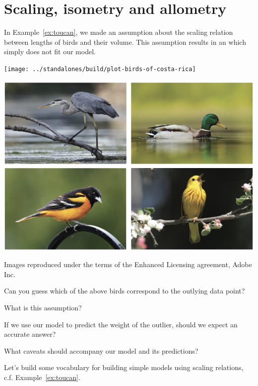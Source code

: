 \documentclass[../main.tex]{subfiles}
\begin{document}
 \section{Scaling, isometry and allometry}
In Example~\ref{ex:toucan}, we made an assumption about the scaling relation between lengths of birds and their volume. This assumption results in an  which simply does not fit our model.

\begin{minipage}{.5\textwidth}
  \texttt{[image: ../standalones/build/plot-birds-of-costa-rica]}
\end{minipage}
\begin{minipage}{.5\textwidth}
  \includegraphics[width=\textwidth]{../standalones/image-birds.png}

  {\footnotesize{} Images reproduced under the terms of the Enhanced Licensing agreement, Adobe Inc.}
\end{minipage}

Can you guess which of the above birds correspond to the outlying data point? 

What is this assumption?

If we use our model to predict the weight of the outlier, should we expect an accurate answer?

What caveats should accompany our model and its predictions?

\clearpage
Let's build some vocabulary for building simple models using scaling relations, c.f. Example~\ref{ex:toucan}.
\end{document}
